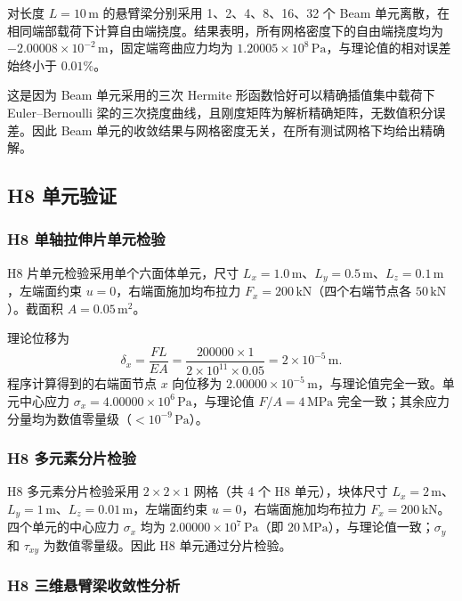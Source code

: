 \documentclass[UTF8,a4paper,zihao=-4]{ctexart}
\begin{document}
对长度 $L=10\,\mathrm{m}$ 的悬臂梁分别采用 1、2、4、8、16、32 个 Beam 单元离散，在相同端部载荷下计算自由端挠度。结果表明，所有网格密度下的自由端挠度均为 $-2.00008\times10^{-2}\,\mathrm{m}$，固定端弯曲应力均为 $1.20005\times10^8\,\mathrm{Pa}$，与理论值的相对误差始终小于 $0.01\%$。

这是因为 Beam 单元采用的三次 Hermite 形函数恰好可以精确插值集中载荷下 Euler--Bernoulli 梁的三次挠度曲线，且刚度矩阵为解析精确矩阵，无数值积分误差。因此 Beam 单元的收敛结果与网格密度无关，在所有测试网格下均给出精确解。

\subsection{H8 单元验证}

\subsubsection{H8 单轴拉伸片单元检验}

H8 片单元检验采用单个六面体单元，尺寸 $L_x=1.0\,\mathrm{m}$、$L_y=0.5\,\mathrm{m}$、$L_z=0.1\,\mathrm{m}$，左端面约束 $u=0$，右端面施加均布拉力 $F_x=200\,\mathrm{kN}$（四个右端节点各 $50\,\mathrm{kN}$）。截面积 $A=0.05\,\mathrm{m^2}$。

理论位移为
\[
    \delta_x = \frac{FL}{EA} = \frac{200000\times1}{2\times10^{11}\times0.05} = 2\times10^{-5}\,\mathrm{m}.
\]
程序计算得到的右端面节点 $x$ 向位移为 $2.00000\times10^{-5}\,\mathrm{m}$，与理论值完全一致。单元中心应力 $\sigma_x=4.00000\times10^6\,\mathrm{Pa}$，与理论值 $F/A=4\,\mathrm{MPa}$ 完全一致；其余应力分量均为数值零量级（$<10^{-9}\,\mathrm{Pa}$）。

\subsubsection{H8 多元素分片检验}

H8 多元素分片检验采用 $2\times2\times1$ 网格（共 4 个 H8 单元），块体尺寸 $L_x=2\,\mathrm{m}$、$L_y=1\,\mathrm{m}$、$L_z=0.01\,\mathrm{m}$，左端面约束 $u=0$，右端面施加均布拉力 $F_x=200\,\mathrm{kN}$。四个单元的中心应力 $\sigma_x$ 均为 $2.00000\times10^7\,\mathrm{Pa}$（即 $20\,\mathrm{MPa}$），与理论值一致；$\sigma_y$ 和 $\tau_{xy}$ 为数值零量级。因此 H8 单元通过分片检验。

\subsubsection{H8 三维悬臂梁收敛性分析}
\end{document}
